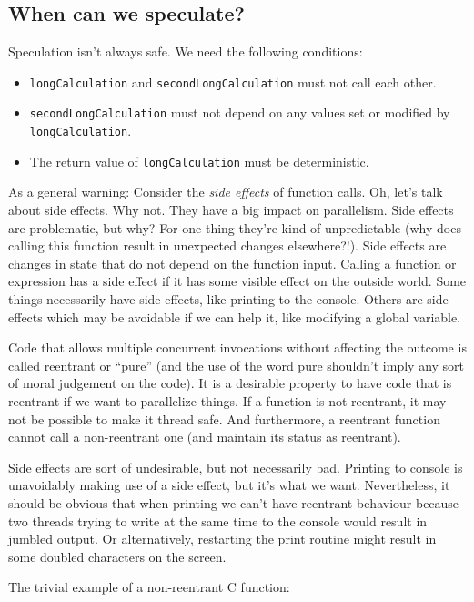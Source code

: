 \subsection*{When can we speculate?}
Speculation isn't always safe. We need the following conditions:
  \begin{itemize}
    \item {\tt longCalculation} and {\tt secondLongCalculation} must not call
      each other.
    \item {\tt secondLongCalculation} must not depend on
      any values set or modified by {\tt longCalculation}.
    \item The return value of {\tt longCalculation} must be deterministic.
  \end{itemize}

As a general warning: Consider the \emph{side effects} of function calls. Oh, let's talk about side effects. Why not. They have a big impact on parallelism. Side effects are problematic, but why? For one thing they're kind of unpredictable (why does calling this function result in unexpected changes elsewhere?!). Side effects are changes in state that do not depend on the function input. Calling a function or expression has a side effect if it has some visible effect on the outside world. Some things necessarily have side effects, like printing to the console. Others are side effects which may be avoidable if we can help it, like modifying a global variable.

Code that allows multiple concurrent invocations without affecting the outcome is called reentrant or ``pure'' (and the use of the word pure shouldn't imply any sort of moral judgement on the code). It is a desirable property to have code that is reentrant if we want to parallelize things. If a function is not reentrant, it may not be possible to make it thread safe. And furthermore, a reentrant function cannot call a non-reentrant one (and maintain its status as reentrant).

Side effects are sort of undesirable, but not necessarily bad. Printing to console is unavoidably making use of a side effect, but it's what we want. Nevertheless, it should be obvious that when printing we can't have reentrant behaviour because two threads trying to write at the same time to the console would result in jumbled output. Or alternatively, restarting the print routine might result in some doubled characters on the screen.

The trivial example of a non-reentrant C function:

